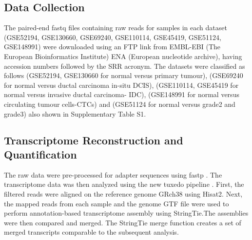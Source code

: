 \documentclass[fleqn,10pt,lineno]{wlpeerj}
\begin{document}
\subsection*{Data Collection}
The paired-end fastq files containing raw reads for samples in each dataset (GSE52194, GSE130660, GSE69240, GSE110114, GSE45419, GSE51124, GSE148991) were downloaded using an FTP link from EMBL-EBI (The European Bioinformatics Institute) ENA (European nucleotide archive), having accession numbers followed by the SRR acronym. The datasets were classified as follows (GSE52194, GSE130660 for normal versus primary tumour), (GSE69240 for normal versus ductal carcinoma in-situ DCIS), (GSE110114, GSE45419 for normal versus invasive ductal carcinoma- IDC), (GSE148991 for normal versus circulating tumour cells-CTCs) and (GSE51124 for normal versus grade2 and grade3) also shown in Supplementary Table S1.

\subsection*{Transcriptome Reconstruction and Quantification}
The raw data were pre-processed for adapter sequences using fastp \citep{Soneson2020}. The transcriptome data was then analyzed using the new tuxedo pipeline \citep{Pertea2016}. First, the filtered reads were aligned on the reference genome GRch38 using Hisat2. Next, the mapped reads from each sample and the genome GTF file were used to perform annotation-based transcriptome assembly using StringTie.The assemblies were then compared and merged. The StringTie merge function creates a set of merged transcripts comparable to the subsequent analysis.
\end{document}
